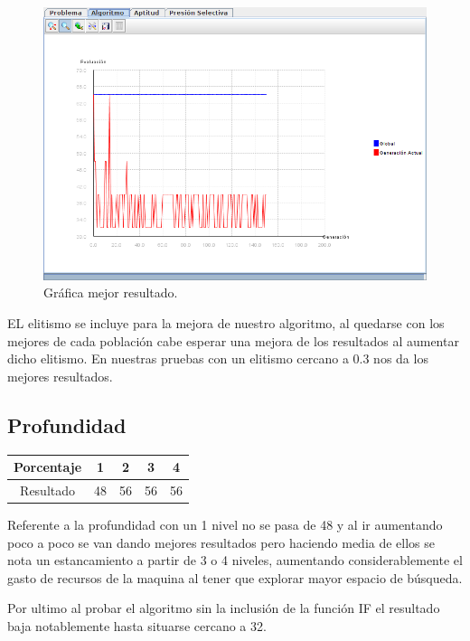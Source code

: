 \documentclass[12pt]{article}
\begin{document}
\begin{figure}[H]
\centering
\includegraphics[scale=0.4]{graficas/eg64}
\caption{Gráfica mejor resultado.}
\end{figure}

EL elitismo se incluye para la mejora de nuestro algoritmo, al quedarse con los mejores de cada población cabe esperar una mejora de los resultados al aumentar dicho elitismo. En nuestras pruebas con un elitismo cercano a 0.3 nos da los mejores resultados.

\subsection{Profundidad}
\begin{table}[H]
\begin{center}
\begin{tabular}{|ccccc|} \hline
Porcentaje   & 1 & 2 & 3 & 4 \\  \hline
Resultado  &  48 & 56 & 56 & 56\\ \hline
\end{tabular}
\end{center}
\end{table}

Referente a la profundidad con un 1 nivel no se pasa de 48 y al ir aumentando poco a poco se van dando mejores resultados pero haciendo media de ellos se nota un estancamiento a partir de 3 o 4 niveles, aumentando considerablemente el gasto de recursos de la maquina al tener que explorar mayor espacio de búsqueda. 

Por ultimo al probar el algoritmo sin la inclusión de la función IF el resultado baja notablemente hasta situarse cercano a 32. 
\end{document}
